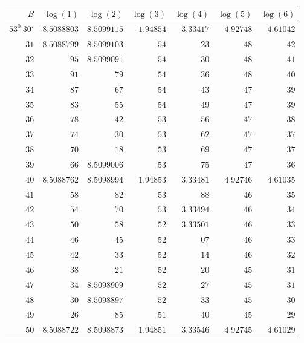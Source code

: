 \clearpage
{}
\begingroup
\fontsize{8}{9}\selectfont
\setlength{\tabcolsep}{5pt}
\renewcommand{\arraystretch}{1.09}
\begin{center}
\begin{tabular}{||r||r|r|r|r|r|r||}
\hline\hline
\(B\)&\(\log(1)\)&\(\log(2)\)&\(\log(3)\)&\(\log(4)\)&\(\log(5)\)&\(\log(6)\)\\
\hline
\(53^0\ 30'\) & \(8.5088803\) & \(8.5099115\) & \(1.94854\) & \(3.33417\) & \(4.92748\) & \(4.61042\)\\
\(31\) & \(8.5088799\) & \(8.5099103\) & \(54\) & \(23\) & \(48\) & \(42\)\\
\(32\) & \(95\) & \(8.5099091\) & \(54\) & \(30\) & \(48\) & \(41\)\\
\(33\) & \(91\) & \(79\) & \(54\) & \(36\) & \(48\) & \(40\)\\
\(34\) & \(87\) & \(67\) & \(54\) & \(43\) & \(47\) & \(39\)\\
\(35\) & \(83\) & \(55\) & \(54\) & \(49\) & \(47\) & \(39\)\\
\(36\) & \(78\) & \(42\) & \(53\) & \(56\) & \(47\) & \(38\)\\
\(37\) & \(74\) & \(30\) & \(53\) & \(62\) & \(47\) & \(37\)\\
\(38\) & \(70\) & \(18\) & \(53\) & \(69\) & \(47\) & \(37\)\\
\(39\) & \(66\) & \(8.5099006\) & \(53\) & \(75\) & \(47\) & \(36\)\\[3pt]
\(40\) & \(8.5088762\) & \(8.5098994\) & \(1.94853\) & \(3.33481\) & \(4.92746\) & \(4.61035\)\\
\(41\) & \(58\) & \(82\) & \(53\) & \(88\) & \(46\) & \(35\)\\
\(42\) & \(54\) & \(70\) & \(53\) & \(3.33494\) & \(46\) & \(34\)\\
\(43\) & \(50\) & \(58\) & \(52\) & \(3.33501\) & \(46\) & \(33\)\\
\(44\) & \(46\) & \(45\) & \(52\) & \(07\) & \(46\) & \(33\)\\
\(45\) & \(42\) & \(33\) & \(52\) & \(14\) & \(46\) & \(32\)\\
\(46\) & \(38\) & \(21\) & \(52\) & \(20\) & \(45\) & \(31\)\\
\(47\) & \(34\) & \(8.5098909\) & \(52\) & \(27\) & \(45\) & \(31\)\\
\(48\) & \(30\) & \(8.5098897\) & \(52\) & \(33\) & \(45\) & \(30\)\\
\(49\) & \(26\) & \(85\) & \(51\) & \(40\) & \(45\) & \(29\)\\[3pt]
\(50\) & \(8.5088722\) & \(8.5098873\) & \(1.94851\) & \(3.33546\) & \(4.92745\) & \(4.61029\)\\

\end{tabular}
\end{center}
